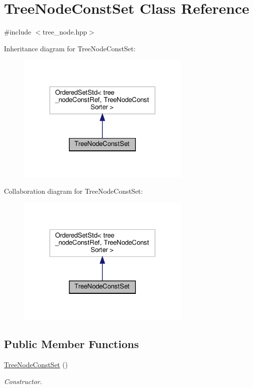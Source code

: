 \hypertarget{classTreeNodeConstSet}{}\section{Tree\+Node\+Const\+Set Class Reference}
\label{classTreeNodeConstSet}


{\ttfamily \#include $<$tree\+\_\+node.\+hpp$>$}



Inheritance diagram for Tree\+Node\+Const\+Set\+:
\nopagebreak
\begin{figure}[H]
\begin{center}
\leavevmode
\includegraphics[width=240pt]{d6/dc7/classTreeNodeConstSet__inherit__graph}
\end{center}
\end{figure}


Collaboration diagram for Tree\+Node\+Const\+Set\+:
\nopagebreak
\begin{figure}[H]
\begin{center}
\leavevmode
\includegraphics[width=240pt]{df/d4b/classTreeNodeConstSet__coll__graph}
\end{center}
\end{figure}
\subsection*{Public Member Functions}
\begin{DoxyCompactItemize}
\item 
\hyperlink{classTreeNodeConstSet_a5307bbf4343e1acac110e44a9b107518}{Tree\+Node\+Const\+Set} ()
\begin{DoxyCompactList}\small\item\em Constructor. \end{DoxyCompactList}\end{DoxyCompactItemize}


